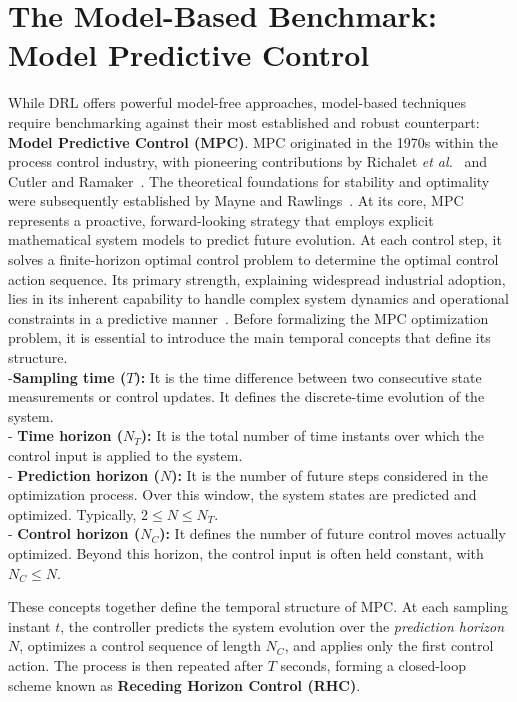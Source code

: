 
\section{The Model-Based Benchmark: Model Predictive Control}

While DRL offers powerful model-free approaches, model-based techniques require benchmarking against their most established and robust counterpart: \textbf{Model Predictive Control (MPC)}. 
\noindent
MPC originated in the 1970s within the process control industry, with pioneering contributions by Richalet \textit{et al.}~\cite{Richalet1978ModelPH} and Cutler and Ramaker~\cite{Cutler1980}. The theoretical foundations for stability and optimality were subsequently established by Mayne and Rawlings~\cite{mayne2000constraine}. 
\noindent
At its core, MPC represents a proactive, forward-looking strategy that employs explicit mathematical system models to predict future evolution. At each control step, it solves a finite-horizon optimal control problem to determine the optimal control action sequence. Its primary strength, explaining widespread industrial adoption, lies in its inherent capability to handle complex system dynamics and operational constraints in a predictive manner~\cite{minchala2025systematic}.
Before formalizing the MPC optimization problem, it is essential to introduce the main temporal concepts that define its structure.
\\
\noindent
    -\textbf{Sampling time ($T$):} It is the time difference between two consecutive
    state measurements or control updates. It defines the discrete-time evolution of the system.
\\
\noindent
    - \textbf{Time horizon ($N_T$):} It is the total number of time instants over which the control input is applied to the system.
\\
\noindent
    - \textbf{Prediction horizon ($N$):} It is the number of future steps considered in the optimization process. Over this window, the system states are predicted and optimized. Typically, $2 \leq N \leq N_T$.
\\
\noindent
    - \textbf{Control horizon ($N_C$):} It defines the number of future control moves actually optimized. Beyond this horizon, the control input is often held constant, with $N_C \leq N$.

These concepts together define the temporal structure of MPC.  
At each sampling instant $t$, the controller predicts the system evolution over the \textit{prediction horizon} $N$, optimizes a control sequence of length $N_C$, and applies only the first control action. The process is then repeated after $T$ seconds, forming a closed-loop scheme known as \textbf{Receding Horizon Control (RHC)}.

